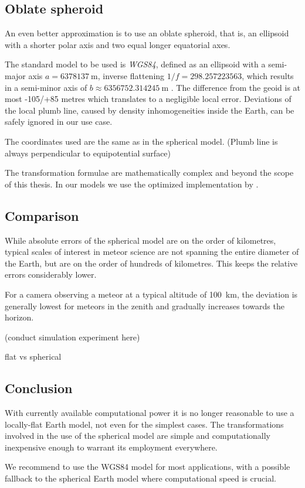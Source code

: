     \subsection{Oblate spheroid} \label{mmo}
        An even better approximation is to use an oblate spheroid,
        that is, an ellipsoid with a shorter polar axis and two
        equal longer equatorial axes.

        The standard model to be used is \emph{WGS84}, defined as an ellipsoid
        with a semi-major axis $a = \SI{6378137}{\metre}$, inverse flattening
        $1/f = \num{298.257223563}$, which results in a semi-minor axis of
        $b \approx \SI{6356752.314245}{\metre}$ \cite{???}.
        The difference from the geoid is at most -105/+85 metres \cite{???}
        which translates to a negligible local error.
        Deviations of the local plumb line, caused by density inhomogeneities
        inside the Earth, can be safely ignored in our use case.

        The coordinates used are the same as in the spherical model. (Plumb line is always perpendicular to equipotential surface)

        The transformation formulae are mathematically complex and beyond the scope of this thesis.
        In our models we use the optimized implementation by \citet{osen2017}.

    \subsection{Comparison} \label{mmc}
        While absolute errors of the spherical model are on the order of kilometres,
        typical scales of interest in meteor science are not spanning the entire diameter of the Earth,
        but are on the order of hundreds of kilometres. This keeps the relative errors considerably lower.

        For a camera observing a meteor at a typical altitude of \SI{100}{\kilo\metre},
        the deviation is generally lowest for meteors in the zenith
        and gradually increases towards the horizon.

        (conduct simulation experiment here)

        flat vs spherical

    \subsection{Conclusion}
        With currently available computational power it is no longer reasonable to
        use a locally-flat Earth model, not even for the simplest cases.
        The transformations involved in the use of the spherical model
        are simple and computationally inexpensive enough to warrant its employment everywhere.

        We recommend to use the WGS84 model for most applications, with a possible
        fallback to the spherical Earth model where computational speed is crucial.
